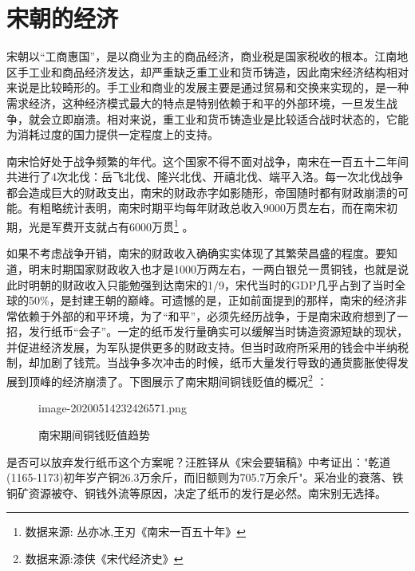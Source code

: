 \documentclass[final]{cvpr}
\begin{document}
\section{宋朝的经济}

宋朝以“工商惠国”，是以商业为主的商品经济，商业税是国家税收的根本。江南地区手工业和商品经济发达，却严重缺乏重工业和货币铸造，因此南宋经济结构相对来说是比较畸形的。手工业和商业的发展主要是通过贸易和交换来实现的，是一种需求经济，这种经济模式最大的特点是特别依赖于和平的外部环境，一旦发生战争，就会立即崩溃。相对来说，重工业和货币铸造业是比较适合战时状态的，它能为消耗过度的国力提供一定程度上的支持。

南宋恰好处于战争频繁的年代。这个国家不得不面对战争，南宋在一百五十二年间共进行了4次北伐：岳飞北伐、隆兴北伐、开禧北伐、端平入洛。每一次北伐战争都会造成巨大的财政支出，南宋的财政赤字如影随形，帝国随时都有财政崩溃的可能。有粗略统计表明，南宋时期平均每年财政总收入9000万贯左右，而在南宋初期，光是军费开支就占有6000万贯\footnote{数据来源: 丛亦冰,王刃《南宋一百五十年》} \cite{南宋一百五十年}。

如果不考虑战争开销，南宋的财政收入确确实实体现了其繁荣昌盛的程度。要知道，明末时期国家财政收入也才是1000万两左右，一两白银兑一贯铜钱，也就是说此时明朝的财政收入只能勉强到达南宋的1/9，宋代当时的GDP几乎占到了当时全球的50\%，是封建王朝的巅峰\cite{你不可不知的经济学}。可遗憾的是，正如前面提到的那样，南宋的经济非常依赖于外部的和平环境，为了“和平”，必须先经历战争，于是南宋政府想到了一招，发行纸币“会子”。一定的纸币发行量确实可以缓解当时铸造资源短缺的现状，并促进经济发展，为军队提供更多的财政支持。但当时政府所采用的钱会中半纳税制，却加剧了钱荒\cite{宋代货币与货币流通研究}。当战争多次冲击的时候，纸币大量发行导致的通货膨胀使得发展到顶峰的经济崩溃了。下图展示了南宋期间铜钱贬值的概况\footnote{数据来源:漆侠《宋代经济史》} \cite{宋代经济史}：

\begin{figure}[h]
  	\begin{overpic}[width=\columnwidth]{image-20200514232426571.png}
    \end{overpic}
    \caption{南宋期间铜钱贬值趋势 
    }\label{fig:colorFre}
\end{figure}

是否可以放弃发行纸币这个方案呢？汪胜铎\cite{两宋货币史}从《宋会要辑稿》中考证出："乾道(1165-1173)初年岁产铜26.3万余斤，而旧额则为705.7万余斤"。采冶业的衰落、铁铜矿资源被夺、铜钱外流等原因，决定了纸币的发行是必然。南宋别无选择。
\end{document}
